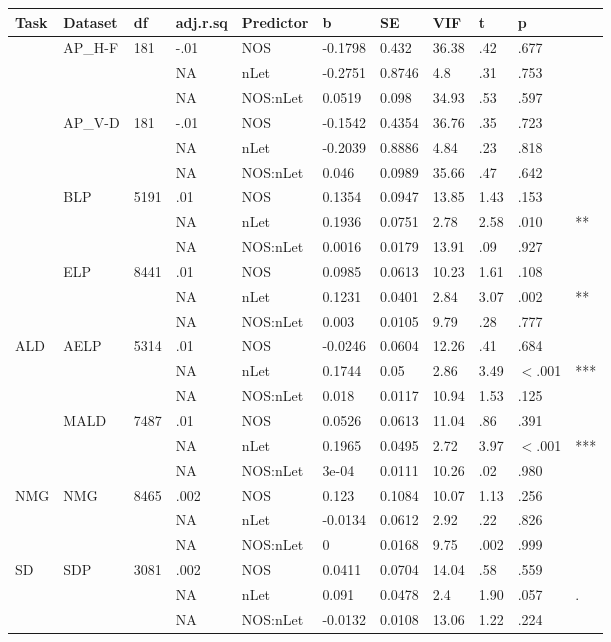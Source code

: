 \begin{table}[ht]
\centering
\begingroup\normalsize
\begin{tabular}{lllllllllll}
  \hline
Task & Dataset & df & adj.r.sq & Predictor & b & SE & VIF & t & p &  \\ 
  \hline
 & AP\_H-F & 181 & -.01 & NOS & -0.1798 & 0.432 & 36.38 & .42 & .677 &   \\ 
   &  &  & NA & nLet & -0.2751 & 0.8746 & 4.8 & .31 & .753 &   \\ 
   &  &  & NA & NOS:nLet & 0.0519 & 0.098 & 34.93 & .53 & .597 &   \\ 
   & AP\_V-D & 181 & -.01 & NOS & -0.1542 & 0.4354 & 36.76 & .35 & .723 &   \\ 
   &  &  & NA & nLet & -0.2039 & 0.8886 & 4.84 & .23 & .818 &   \\ 
   &  &  & NA & NOS:nLet & 0.046 & 0.0989 & 35.66 & .47 & .642 &   \\ 
   & BLP & 5191 & .01 & NOS & 0.1354 & 0.0947 & 13.85 & 1.43 & .153 &   \\ 
   &  &  & NA & nLet & 0.1936 & 0.0751 & 2.78 & 2.58 & .010 & ** \\ 
   &  &  & NA & NOS:nLet & 0.0016 & 0.0179 & 13.91 & .09 & .927 &   \\ 
   & ELP & 8441 & .01 & NOS & 0.0985 & 0.0613 & 10.23 & 1.61 & .108 &   \\ 
   &  &  & NA & nLet & 0.1231 & 0.0401 & 2.84 & 3.07 & .002 & ** \\ 
   &  &  & NA & NOS:nLet & 0.003 & 0.0105 & 9.79 & .28 & .777 &   \\ 
  ALD & AELP & 5314 & .01 & NOS & -0.0246 & 0.0604 & 12.26 & .41 & .684 &   \\ 
   &  &  & NA & nLet & 0.1744 & 0.05 & 2.86 & 3.49 & $<$.001 & *** \\ 
   &  &  & NA & NOS:nLet & 0.018 & 0.0117 & 10.94 & 1.53 & .125 &   \\ 
   & MALD & 7487 & .01 & NOS & 0.0526 & 0.0613 & 11.04 & .86 & .391 &   \\ 
   &  &  & NA & nLet & 0.1965 & 0.0495 & 2.72 & 3.97 & $<$.001 & *** \\ 
   &  &  & NA & NOS:nLet & 3e-04 & 0.0111 & 10.26 & .02 & .980 &   \\ 
  NMG & NMG & 8465 & .002 & NOS & 0.123 & 0.1084 & 10.07 & 1.13 & .256 &   \\ 
   &  &  & NA & nLet & -0.0134 & 0.0612 & 2.92 & .22 & .826 &   \\ 
   &  &  & NA & NOS:nLet & 0 & 0.0168 & 9.75 & .002 & .999 &   \\ 
  SD & SDP & 3081 & .002 & NOS & 0.0411 & 0.0704 & 14.04 & .58 & .559 &   \\ 
   &  &  & NA & nLet & 0.091 & 0.0478 & 2.4 & 1.90 & .057 & . \\ 
   &  &  & NA & NOS:nLet & -0.0132 & 0.0108 & 13.06 & 1.22 & .224 &   \\ 
   \hline
\end{tabular}
\endgroup
\end{table}
